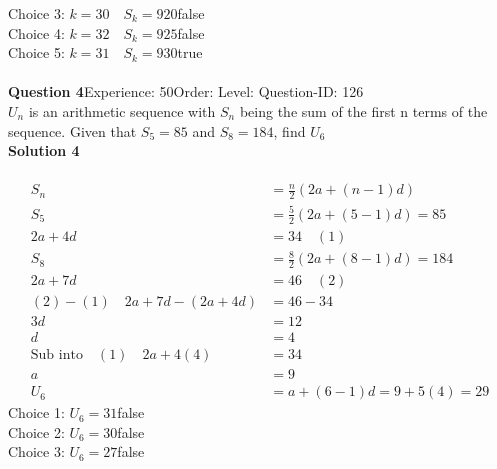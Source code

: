 \documentclass{article}
\begin{document}
Choice 3: \hspace{20pt}$k=30 \quad S_k=920$\hspace{20pt}false\\
Choice 4: \hspace{20pt}$k=32 \quad S_k=925$\hspace{20pt}false\\
Choice 5: \hspace{20pt}$k=31 \quad S_k=930$\hspace{20pt}true\\
\\[4pt]
\noindent\textbf{Question 4}\hspace{20pt}Experience: 50\hspace{20pt}Order: \hspace{20pt}Level: \hspace{20pt}Question-ID: 126\\[2pt]
$U_n$ is an arithmetic sequence with $S_n$ being the sum of the first n terms of the sequence. Given that $S_{5}=85$ and $S_8=184$, find $U_{6}$\\[4pt]
\noindent\textbf{Solution 4}\\[2pt]
\\[-35pt]\begin{align*}
S_n&=\displaystyle\frac{n}{2}(2a+(n-1)d)\\[2pt]
S_5&=\displaystyle\frac{5}{2}(2a+(5-1)d)=85\\[2pt]
2a+4d&=34\quad (1)\\[2pt]
S_8&=\displaystyle\frac{8}{2}(2a+(8-1)d)=184\\[2pt]
2a+7d&=46 \quad (2)\\[2pt]
(2)-(1) \quad 2a+7d-(2a+4d)&=46-34\\[2pt]
3d&=12\\[2pt]
d&=4\\[2pt]
\text{Sub into}\quad (1) \quad 2a+4(4)&=34\\[2pt]
a&=9\\[12pt]
U_6&=a+(6-1)d=9+5(4)=29
\end{align*}
Choice 1: \hspace{20pt}$U_{6}=31$\hspace{20pt}false\\
Choice 2: \hspace{20pt}$U_{6}=30$\hspace{20pt}false\\
Choice 3: \hspace{20pt}$U_{6}=27$\hspace{20pt}false\\
\end{document}

